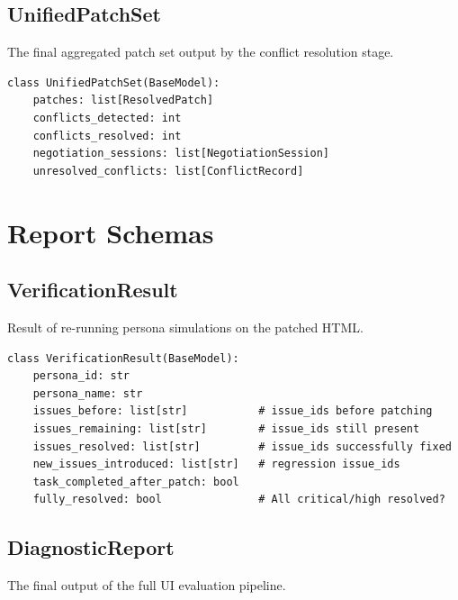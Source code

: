 \subsection{UnifiedPatchSet}

The final aggregated patch set output by the conflict resolution stage.

\begin{lstlisting}[caption={UnifiedPatchSet Pydantic model (from \filepath{schemas/patch\_schema.py}).}, label={lst:unifiedpatchset}]
class UnifiedPatchSet(BaseModel):
    patches: list[ResolvedPatch]
    conflicts_detected: int
    conflicts_resolved: int
    negotiation_sessions: list[NegotiationSession]
    unresolved_conflicts: list[ConflictRecord]
\end{lstlisting}


\section{Report Schemas}
\label{app:report-schemas}

\subsection{VerificationResult}

Result of re-running persona simulations on the patched HTML.

\begin{lstlisting}[caption={VerificationResult Pydantic model (from \filepath{schemas/report\_schema.py}).}, label={lst:verificationresult}]
class VerificationResult(BaseModel):
    persona_id: str
    persona_name: str
    issues_before: list[str]           # issue_ids before patching
    issues_remaining: list[str]        # issue_ids still present
    issues_resolved: list[str]         # issue_ids successfully fixed
    new_issues_introduced: list[str]   # regression issue_ids
    task_completed_after_patch: bool
    fully_resolved: bool               # All critical/high resolved?
\end{lstlisting}

\subsection{DiagnosticReport}

The final output of the full UI evaluation pipeline.

